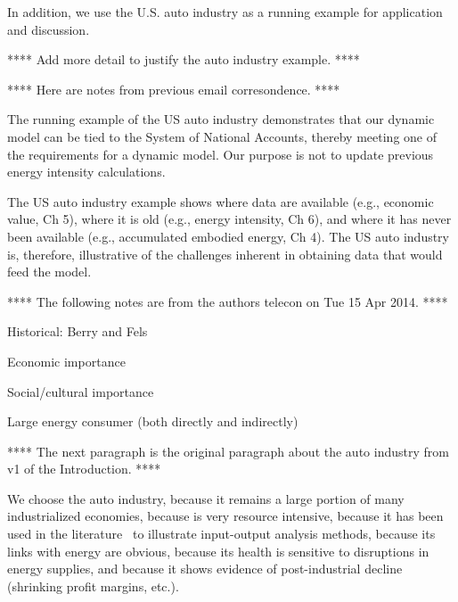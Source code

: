 In addition, we use the U.S. auto industry 
as a running example for application and discussion.

**** Add more detail to justify the auto industry example. **** 

**** Here are notes from previous email corresondence. ****

The running example of the US auto industry demonstrates that our dynamic model 
can be tied to the System of National Accounts, 
thereby meeting one of the requirements for a dynamic model. 
Our purpose is not to update previous energy intensity calculations.

The US auto industry example shows where data are available 
(e.g., economic value, Ch 5), 
where it is old (e.g., energy intensity, Ch 6), 
and where it has never been available (e.g., accumulated embodied energy, Ch 4).  
The US auto industry is, therefore, 
illustrative of the challenges inherent in obtaining data that would feed the model.

**** The following notes are from the authors telecon on Tue 15 Apr 2014. ****

Historical: Berry and Fels

Economic importance

Social/cultural importance

Large energy consumer (both directly and indirectly)

**** The next paragraph is the original paragraph about the auto industry 
from v1 of the Introduction. ****

We choose the auto industry,
because it remains a large portion of many industrialized economies, 
because is very resource intensive,
because it has been used in the literature~\cite{Bullard:1978vd}
to illustrate input-output analysis methods, 
because its links with energy are obvious,
because its health is sensitive to disruptions in energy supplies, and
because it shows evidence of post-industrial decline (shrinking profit margins, etc.).






